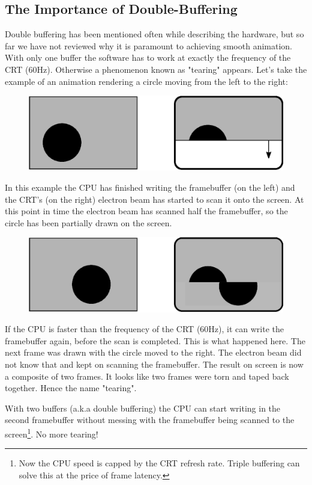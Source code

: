 \documentclass[book.tex]{subfiles}
\begin{document}
\subsection{The Importance of Double-Buffering}
Double buffering has been mentioned often while describing the hardware, but so far we have not reviewed why it is paramount to achieving smooth animation. With only one buffer the software has to work at exactly the frequency of the CRT (60Hz). Otherwise a phenomenon known as "tearing" appears. Let's take the example of an animation rendering a circle moving from the left to the right:
\par
\begin{figure}[H]
\centering
\includegraphics[width=\textwidth]{imgs/drawings/doublebuffer_before.eps}
\end{figure}
\par
In this example the CPU has finished writing the framebuffer (on the left) and the CRT's (on the right) electron beam has started to scan it onto the screen. At this point in time the electron beam has scanned half the framebuffer, so the circle has been partially drawn on the screen.
\par
\begin{figure}[H]
\centering
\includegraphics[width=\textwidth]{imgs/drawings/doublebuffer_after.eps}
\end{figure}
\par
If the CPU is faster than the frequency of the CRT (60Hz), it can write the framebuffer again, before the scan is completed. This is what happened here. The next frame was drawn with the circle moved to the right. The electron beam did not know that and kept on scanning the framebuffer. The result on screen is now a composite of two frames. It looks like two frames were torn and taped back together. Hence the name "tearing".\\
\par
With two buffers (a.k.a double buffering) the CPU can start writing in the second framebuffer without messing with the framebuffer being scanned to the screen\footnote{Now the CPU speed is capped by the CRT refresh rate. Triple buffering can solve this at the price of frame latency.}. No more tearing!\\
\end{document}
